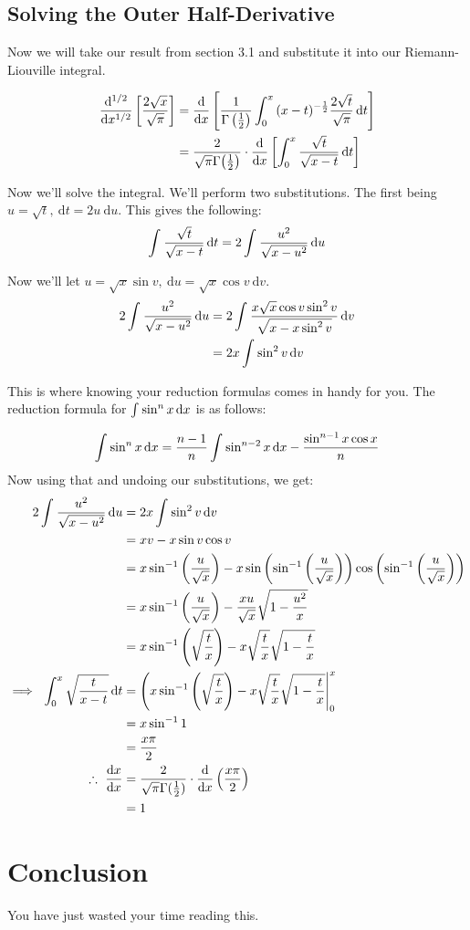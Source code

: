 \documentclass[a4paper, twoside]{article}
\renewcommand{\d}{\mathrm{d}}
\begin{document}
\subsection{Solving the Outer Half-Derivative}
Now we will take our result from section 3.1 and substitute it into our Riemann-Liouville integral.

\begin{align*}
    \ndiff{1/2}{}{x}\left[\frac{2\sqrt{x}}{\sqrt{\pi}}\right] &= \diff{}{x}\left[ \frac{1}{\Gamma\left(\frac{1}{2}\right)} \Int{0}{x}{(x-t)^{-\frac{1}{2}}\frac{2\sqrt{t}}{\sqrt{\pi}}}{t}\right]\\
    &=\frac{2}{\sqrt{\pi}\Gamma{\left(\frac{1}{2}\right)}}\cdot\diff{}{x}\left[ \Int{0}{x}{\frac{\sqrt{t}}{\sqrt{x-t}}}{t} \right]
\end{align*}

Now we'll solve the integral. We'll perform two substitutions. The first being \(u=\sqrt{t}, \ \d t=2u\ \d u\). This gives the following:
\[
    \int_{}^{}{\frac{\sqrt{t}}{\sqrt{x-t}}\,\text{d} t}=2\int_{}^{}{\frac{u^2}{\sqrt{x-u^2}}\,\text{d} u}
\]

Now we'll let \(u=\sqrt{x}\sin{v}, \ \d u =\sqrt{x}\cos{v} \ \d v\).
\begin{align*}
    2\int_{}^{}{\frac{u^2}{\sqrt{x-u^2}}\,\text{d} u}&=2\int_{}^{}{\frac{
    x\sqrt{x}\cos{v}\sin^2{v}
    }{
    \sqrt{x-x\sin^2{v}}
    }\,\text{d} v}\\
    &=2x\int_{}^{}{\sin^2{v}\,\text{d} v}
\end{align*}

This is where knowing your reduction formulas comes in handy for you. The reduction formula for $\int_{}^{}{\sin^n{x}\,\text{d} x}$ is as follows:

\[
    \int_{}^{}{\sin^n{x}\,\text{d} x}=\frac{n-1}{n}\int_{}^{}{\sin^{n-2}x\,\text{d} x}-\frac{\sin^{n-1}x\cos{x}}{n}
\]
Now using that and undoing our substitutions, we get:
\begin{align*}
    2\Int{}{}{\frac{u^2}{\sqrt{x-u^2}}}{u}&=2x\Int{}{}{\sin^2{v}}{v}\\
    &=xv-x\sin{v}\cos{v}\\
    &=x\sin^{-1}\left( \frac{u}{\sqrt{x}} \right)-x\sin\left( \sin^{-1}\left( \frac{u}{\sqrt{x}} \right) \right)\cos\left({\sin^{-1}\left( \frac{u}{\sqrt{x}} \right)}\right)\\
    &=x\sin^{-1}\left( \frac{u}{\sqrt{x}} \right)-\frac{xu}{\sqrt{x}}\sqrt{1-\frac{u^2}{x}}\\
    &=x\sin^{-1}\left( \sqrt{\frac{t}{x}} \right) -x\sqrt{\frac{t}{x}}\sqrt{1-\frac{t}{x}}\\
    \implies \ \Int{0}{x}{\sqrt{\frac{t}{x-t}}}{t}&=\evalone{x\sin^{-1}\left( \sqrt{\frac{t}{x}} \right) -x\sqrt{\frac{t}{x}}\sqrt{1-\frac{t}{x}}}{0}{x}\\
    &=x\sin^{-1}{1}\\
    &=\frac{x\pi}{2}\\
    \therefore \ \diff{x}{x}&=\frac{2}{\sqrt{\pi}\Gamma{(\frac{1}{2})}}\cdot\diff{}{x}\left(\frac{x\pi}{2}\right)\\
    &=1
\end{align*}

\newpage

\section{Conclusion}
You have just wasted your time reading this.
\end{document}
